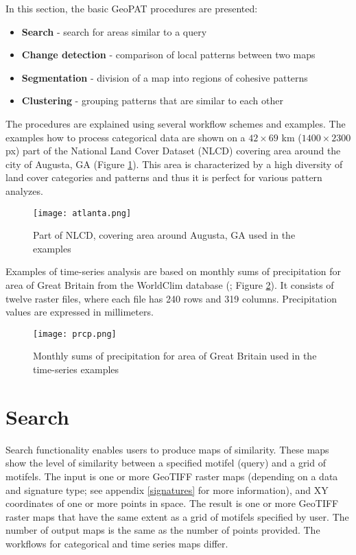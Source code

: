 In this section, the basic GeoPAT procedures are presented: 

\begin{itemize}
	\item {\bf Search} - search for areas similar to a query
	\item {\bf Change detection} - comparison of local patterns between two maps
	\item {\bf Segmentation} - division of a map into regions of cohesive patterns
	\item {\bf Clustering} - grouping patterns that are similar to each other
\end{itemize}

The procedures are explained using several workflow schemes and examples.
The examples how to process categorical data are shown on a $42\times 69$ km ($1400\times 2300$ px) part of the National Land Cover Dataset (NLCD) covering area around the city of Augusta, GA (Figure \ref{FIG:AUGUSTA}).
This area is characterized by a high diversity of land cover categories and patterns and thus it is perfect for various pattern analyzes.

\begin{figure}[H]
	\centering
	\texttt{[image: atlanta.png]}
	\caption{Part of NLCD, covering area around Augusta, GA used in the examples}
	\label{FIG:AUGUSTA}
\end{figure}

Examples of time-series analysis are based on monthly sums of precipitation for area of Great Britain from the WorldClim database (\cite{hijmans2005very}; Figure \ref{FIG:PRCP}).
It consists of twelve raster files, where each file has 240 rows and 319 columns.
Precipitation values are expressed in millimeters.

\begin{figure}[H]
	\centering
	\texttt{[image: prcp.png]}
	\caption{Monthly sums of precipitation for area of Great Britain used in the time-series examples}
	\label{FIG:PRCP}
\end{figure}

\FloatBarrier

\section{Search}

Search functionality enables users to produce maps of similarity. 
These maps show the level of similarity between a specified motifel (query) and a grid of motifels.
The input is one or more GeoTIFF raster maps (depending on a data and signature type; see appendix \ref{signatures} for more information), and XY coordinates of one or more points in space.
The result is one or more GeoTIFF raster maps that have the same extent as a grid of motifels specified by user.
The number of output maps is the same as the number of points provided.
The workflows for categorical and time series maps differ.

